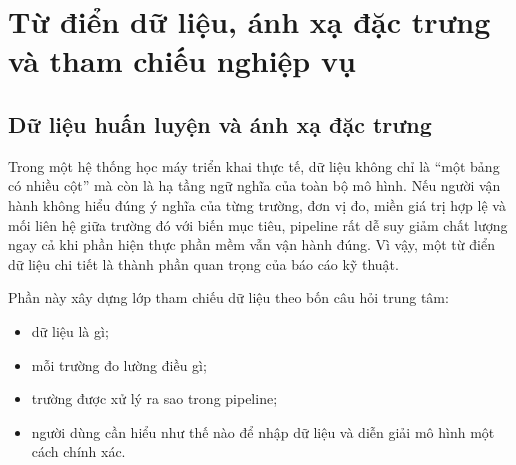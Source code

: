 \section{Từ điển dữ liệu, ánh xạ đặc trưng và tham chiếu nghiệp vụ}

\subsection{Dữ liệu huấn luyện và ánh xạ đặc trưng}

Trong một hệ thống học máy triển khai thực tế, dữ liệu không chỉ là ``một bảng có nhiều cột'' mà còn là hạ tầng ngữ nghĩa của toàn bộ mô hình. Nếu người vận hành không hiểu đúng ý nghĩa của từng trường, đơn vị đo, miền giá trị hợp lệ và mối liên hệ giữa trường đó với biến mục tiêu, pipeline rất dễ suy giảm chất lượng ngay cả khi phần hiện thực phần mềm vẫn vận hành đúng. Vì vậy, một từ điển dữ liệu chi tiết là thành phần quan trọng của báo cáo kỹ thuật.

Phần này xây dựng lớp tham chiếu dữ liệu theo bốn câu hỏi trung tâm:
\begin{itemize}
    \item dữ liệu là gì;
    \item mỗi trường đo lường điều gì;
    \item trường được xử lý ra sao trong pipeline;
    \item người dùng cần hiểu như thế nào để nhập dữ liệu và diễn giải mô hình một cách chính xác.
\end{itemize}

